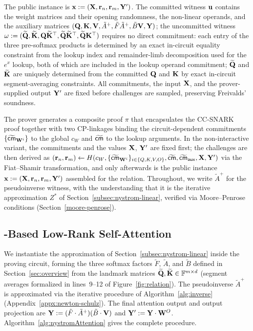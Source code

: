 \documentclass[runningheads]{llncs}
\begin{document}
The public instance is ${\mathbf{x}}:=({\mathbf{X}},{\mathbf{r}}_n,{\mathbf{r}}_m,{\mathbf{Y}}')$. The committed witness ${\mathbf{u}}$ contains the weight matrices and their opening randomness, the non-linear operands, and the auxiliary matrices $({\mathbf{Q}},{\mathbf{K}},{\mathbf{V}},\tilde{A}^{+},\tilde{F}\tilde{A}^{+},\tilde{B}{\mathbf{V}},{\mathbf{Y}})$; the uncommitted witness ${\mathbf{\omega}} := (\widetilde{{\mathbf{Q}}}, \widetilde{{\mathbf{K}}}, {\mathbf{Q}}\widetilde{{\mathbf{K}}}^{\top}, \widetilde{{\mathbf{Q}}}\widetilde{{\mathbf{K}}}^{\top}, \widetilde{{\mathbf{Q}}}{\mathbf{K}}^{\top})$ requires no direct commitment: each entry of the three pre-softmax products is determined by an exact in-circuit equality constraint from the lookup index and remainder-limb decomposition used for the $e^x$ lookup, both of which are included in the lookup operand commitment; $\widetilde{{\mathbf{Q}}}$ and $\widetilde{{\mathbf{K}}}$ are uniquely determined from the committed ${\mathbf{Q}}$ and ${\mathbf{K}}$ by exact in-circuit segment-averaging constraints. All commitments, the input ${\mathbf{X}}$, and the prover-supplied output ${\mathbf{Y}}'$ are fixed before challenges are sampled, preserving Freivalds' soundness.

The prover generates a composite proof $\pi$ that encapsulates the CC-SNARK proof together with two CP-linkages binding the circuit-dependent commitments $\{\widetilde{{\sf cm}}_{{\mathbf{W}}^i}\}$ to the global $c_W$ and $\widetilde{{\sf cm}}$ to the lookup arguments. In the non-interactive variant, the commitments and the values ${\mathbf{X}}$, ${\mathbf{Y}}'$ are fixed first; the challenges are then derived as $({\mathbf{r}}_n, {\mathbf{r}}_m) \gets H(c_W, \{\widetilde{{\sf cm}}_{{\mathbf{W}}^i}\}_{i\in\{Q,K,V,O\}}, \widetilde{{\sf cm}}, \widetilde{{\sf cm}}_{\mathsf{aux}}, {\mathbf{X}}, {\mathbf{Y}}')$ via the Fiat--Shamir transformation, and only afterwards is the public instance ${\mathbf{x}}:=({\mathbf{X}},{\mathbf{r}}_n,{\mathbf{r}}_m,{\mathbf{Y}}')$ assembled for the relation.
Throughout, we write $\tilde{A}^{+}$ for the pseudoinverse witness, with the understanding that it is the iterative approximation $Z^{*}$ of Section~\ref{subsec:nystrom-linear}, verified via Moore--Penrose conditions (Section~\ref{moore-penrose}).

\subsection{\nystrom-Based Low-Rank Self-Attention}\label{subsec:nystrom-attention}
We instantiate the \nystrom approximation of Section~\ref{subsec:nystrom-linear} inside the proving circuit, forming the three softmax factors $\tilde{F}$, $\tilde{A}$, and $\tilde{B}$ defined in Section~\ref{sec:overview} from the landmark matrices $\widetilde{{\mathbf{Q}}},\widetilde{{\mathbf{K}}}\in\mathbb{F}^{m\times d}$ (segment averages formalized in lines~9--12 of Figure~\ref{fig:relation}).
The pseudoinverse $\tilde{A}^{+}$ is approximated via the iterative procedure of Algorithm~\ref{alg:inverse} (Appendix~\ref{appx:newton-schulz}). The final attention output and output projection are
${\mathbf{Y}} := (\tilde{F}\cdot\tilde{A}^{+})(\tilde{B}\cdot{\mathbf{V}})$ and ${\mathbf{Y}}' := {\mathbf{Y}}\cdot{\mathbf{W}}^O$.
Algorithm~\ref{alg:nystromAttention} gives the complete procedure.
\end{document}
